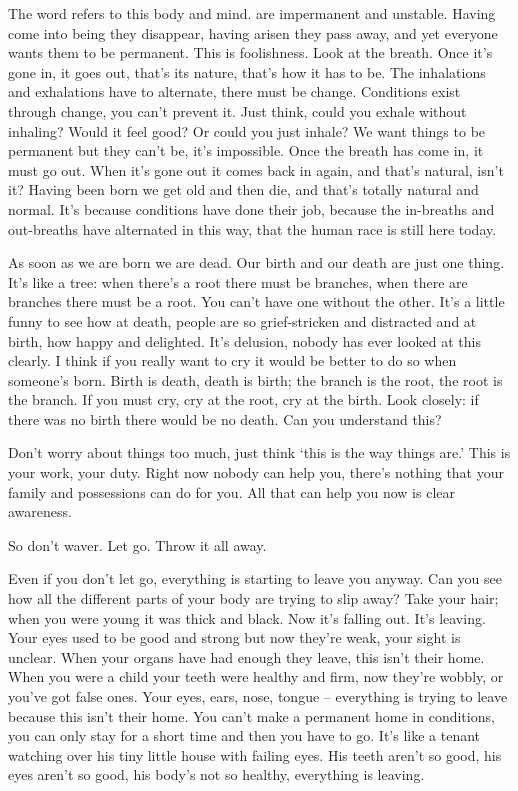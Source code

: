 The word  refers to this body and mind.  are impermanent and unstable. Having come into being they disappear, having arisen they pass away, and yet everyone wants them to be permanent. This is foolishness. Look at the breath. Once it's gone in, it goes out, that's its nature, that's how it has to be. The inhalations and exhalations have to alternate, there must be change. Conditions exist through change, you can't prevent it. Just think, could you exhale without inhaling? Would it feel good? Or could you just inhale? We want things to be permanent but they can't be, it's impossible. Once the breath has come in, it must go out. When it's gone out it comes back in again, and that's natural, isn't it? Having been born we get old and then die, and that's totally natural and normal. It's because conditions have done their job, because the in-breaths and out-breaths have alternated in this way, that the human race is still here today. 

As soon as we are born we are dead. Our birth and our death are just one thing. It's like a tree: when there's a root there must be branches, when there are branches there must be a root. You can't have one without the other. It's a little funny to see how at death, people are so grief-stricken and distracted and at birth, how happy and delighted. It's delusion, nobody has ever looked at this clearly. I think if you really want to cry it would be better to do so when someone's born. Birth is death, death is birth; the branch is the root, the root is the branch. If you must cry, cry at the root, cry at the birth. Look closely: if there was no birth there would be no death. Can you understand this? 

Don't worry about things too much, just think `this is the way things are.' This is your work, your duty. Right now nobody can help you, there's nothing that your family and possessions can do for you. All that can help you now is clear awareness. 

So don't waver. Let go. Throw it all away. 

Even if you don't let go, everything is starting to leave you anyway. Can you see how all the different parts of your body are trying to slip away? Take your hair; when you were young it was thick and black. Now it's falling out. It's leaving. Your eyes used to be good and strong but now they're weak, your sight is unclear. When your organs have had enough they leave, this isn't their home. When you were a child your teeth were healthy and firm, now they're wobbly, or you've got false ones. Your eyes, ears, nose, tongue -- everything is trying to leave because this isn't their home. You can't make a permanent home in conditions, you can only stay for a short time and then you have to go. It's like a tenant watching over his tiny little house with failing eyes. His teeth aren't so good, his eyes aren't so good, his body's not so healthy, everything is leaving. 

